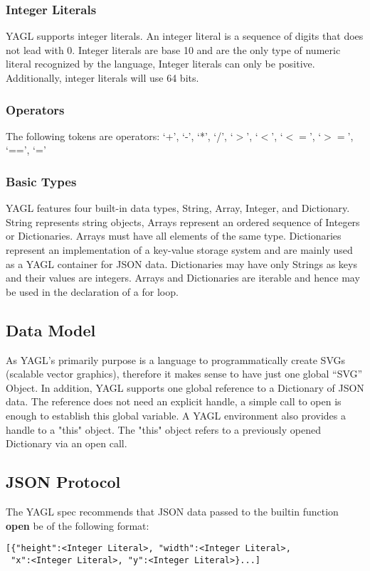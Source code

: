 \documentclass[12pt]{article}
\begin{document}
\subsubsection{Integer Literals}
YAGL supports integer literals.  An integer literal is a sequence of digits that does not lead with 0. Integer literals are base 10 and are the only type of numeric literal recognized by the language, Integer literals can only be positive.  Additionally, integer literals will use 64 bits.

\subsubsection{Operators}
The following tokens are operators:
‘+’, ‘-’, ‘*’, ‘/’, ‘$>$’, ‘$<$’, ‘$<=$’, ‘$>=$’, ‘==’, ‘=’

\subsubsection{Basic Types}
YAGL features four built-in data types, String, Array, Integer, and Dictionary. String represents string objects, Arrays represent an ordered sequence of Integers or Dictionaries. Arrays must have all elements of the same type.  Dictionaries represent an implementation of a key-value storage system and are mainly used as a YAGL container for JSON data. Dictionaries may have only Strings as keys and their values are integers. Arrays and Dictionaries are iterable and hence may be used in the declaration of a for loop. 

\subsection{Data Model}
As YAGL’s primarily purpose is a language to programmatically create SVGs (scalable vector graphics),
therefore it makes sense to have just one global “SVG” Object. In addition, YAGL supports one global reference to a Dictionary of JSON data. The reference does not need an explicit handle, a simple call to open is enough to establish this global variable. A YAGL environment also provides a handle to a "this" object. The "this" object refers to a previously opened Dictionary via an open call.

\subsection{JSON Protocol}
The YAGL spec recommends that JSON data passed to the 
builtin function \textbf{open} be of the following format:
\begin{lstlisting}
[{"height":<Integer Literal>, "width":<Integer Literal>,
 "x":<Integer Literal>, "y":<Integer Literal>}...]
\end{lstlisting}
\end{document}
